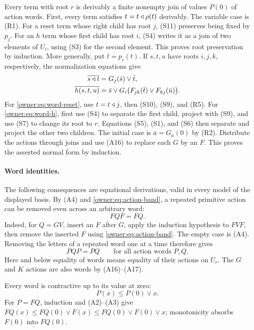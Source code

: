 Every term with root $r$ is derivably a finite nonempty join of
values $P(0)$ of action words. First, every term satisfies
$t=t\mathbin{\triangleleft}\rho(t)$ derivably. The variable case is (R1).
For a reset term whose right child has root $j$, (S11) preserves
being fixed by $p_j$. For an $h$ term whose first child has root $i$,
(S4) writes it as a join of two elements of $U_i$, using (S3)
for the second element. This proves root preservation by induction.
More generally, put
$\bar t=p_r(t)$. If $s,t,u$ have roots $i,j,k$, respectively, the
normalization equations give
\begin{align}
 \overline{s\mathbin{\triangleleft} t}&=G_j(\bar s)\vee\bar t,\label{owner:eq:word-reset}\\
 \overline{h(s,t,u)}&=\bar s\vee
 G_i\bigl(F_{jk}(\bar t)\vee F_{kj}(\bar u)\bigr).
 \label{owner:eq:word-h}
\end{align}
For \eqref{owner:eq:word-reset}, use $t=t\mathbin{\triangleleft} j$, then
(S10), (S9), and (R5). For \eqref{owner:eq:word-h}, first use
(S4) to separate the first child, project with (S9), and use
(S7) to change its root to $r$. Equations (S5), (S1), and (S6)
then separate and project the other two children.
The initial case is $\bar a=G_a(0)$ by (R2).
Distribute the actions through joins and use (A16) to replace each
$G$ by an $F$. This proves the asserted normal form by induction.

\paragraph{Word identities.}
The following consequences are equational derivations, valid in
every model of the displayed basis. By (A4) and \eqref{owner:eq:action-band}, a repeated
primitive action can be removed even across an arbitrary word:
\[
 FQF=FQ.
\]
Indeed, for $Q=GV$, insert an $F$ after $G$, apply the induction
hypothesis to $FVF$, then remove the inserted $F$ using \eqref{owner:eq:action-band}.
The empty case is (A4). Removing the letters of a repeated word
one at a time therefore gives
\begin{equation}\label{owner:eq:word-band}
 PQP=PQ
 \qquad\text{for all action words }P,Q.
\end{equation}
Here and below equality of words means equality of their actions
on $U_r$. The $G$ and $K$ actions are also words by (A16)--(A17).

Every word is contractive up to its value at zero:
\begin{equation}\label{owner:eq:word-contract}
 P(x)\leq P(0)\vee x.
\end{equation}
For $P=FQ$, induction and (A2)--(A3) give
$FQ(x)\leq FQ(0)\vee F(x)\leq FQ(0)\vee F(0)\vee x$;
monotonicity absorbs $F(0)$ into $FQ(0)$.

